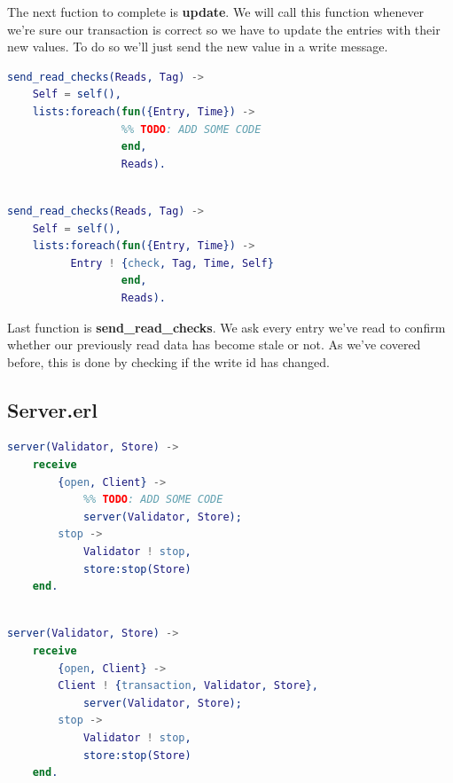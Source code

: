 \documentclass[a4paper, 10pt]{article}
\begin{document}
  The next fuction to complete is \textbf{update}. We will call this function whenever we're sure our transaction is correct so we have to update the entries with their new values. To do so we'll just send the new value in a write message.


\begin{minipage}{.45\textwidth}
	\begin{lstlisting}[language=erlang, caption={Template}]
send_read_checks(Reads, Tag) ->
    Self = self(),
    lists:foreach(fun({Entry, Time}) -> 
                  %% TODO: ADD SOME CODE
                  end, 
                  Reads).
 	\end{lstlisting}
    \end{minipage}\hfill
    \begin{minipage}{.45\textwidth}
	\begin{lstlisting}[language=erlang, caption={Filled version}]

send_read_checks(Reads, Tag) ->
    Self = self(),
    lists:foreach(fun({Entry, Time}) -> 
		  Entry ! {check, Tag, Time, Self}
                  end, 
                  Reads).
  	\end{lstlisting}
  \end{minipage}

Last function is \textbf{send\_read\_checks}. We ask every entry we've read to confirm whether our previously read data has become stale or not. As we've covered before, this is done by checking if the write id has changed.

\clearpage

\subsection{Server.erl}

\begin{minipage}{.45\textwidth}
	\begin{lstlisting}[language=erlang, caption={Template}]
server(Validator, Store) ->
    receive 
        {open, Client} ->
            %% TODO: ADD SOME CODE
            server(Validator, Store);
        stop ->
            Validator ! stop,
            store:stop(Store)
    end.
 	\end{lstlisting}
    \end{minipage}\hfill
    \begin{minipage}{.45\textwidth}
	\begin{lstlisting}[language=erlang, caption={Filled version}]

server(Validator, Store) ->
    receive 
        {open, Client} ->
	    Client ! {transaction, Validator, Store},
            server(Validator, Store);
        stop ->
            Validator ! stop,
            store:stop(Store)
    end.
  	\end{lstlisting}
  \end{minipage}
\end{document}
